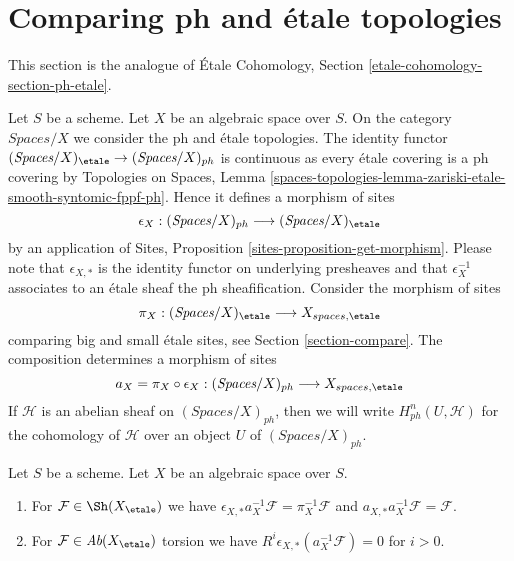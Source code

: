 \section{Comparing ph and \'etale topologies}
\label{section-ph-etale}

\noindent
This section is the analogue of
\'Etale Cohomology, Section \ref{etale-cohomology-section-ph-etale}.

\medskip\noindent
Let $S$ be a scheme. Let $X$ be an algebraic space over $S$.
On the category $\textit{Spaces}/X$ we consider the ph
and \'etale topologies. The identity functor
$(\textit{Spaces}/X)_\etale \to (\textit{Spaces}/X)_{ph}$
is continuous as every \'etale covering is a ph covering by
Topologies on Spaces, Lemma
\ref{spaces-topologies-lemma-zariski-etale-smooth-syntomic-fppf-ph}.
Hence it defines a morphism of sites
$$
\epsilon_X :
(\textit{Spaces}/X)_{ph} \longrightarrow (\textit{Spaces}/X)_\etale
$$
by an application of Sites, Proposition \ref{sites-proposition-get-morphism}.
Please note that $\epsilon_{X, *}$ is the identity functor on underlying
presheaves and that $\epsilon_X^{-1}$ associates to an \'etale sheaf the
ph sheafification.
Consider the morphism of sites
$$
\pi_X : (\textit{Spaces}/X)_\etale \longrightarrow X_{spaces, \etale}
$$
comparing big and small \'etale sites, see Section \ref{section-compare}.
The composition determines a morphism of sites
$$
a_X = \pi_X \circ \epsilon_X :
(\textit{Spaces}/X)_{ph}
\longrightarrow
X_{spaces, \etale}
$$
If $\mathcal{H}$ is an abelian sheaf on $(\textit{Spaces}/X)_{ph}$,
then we will write $H^n_{ph}(U, \mathcal{H})$ for the cohomology
of $\mathcal{H}$ over an object $U$ of $(\textit{Spaces}/X)_{ph}$.

\begin{lemma}
\label{lemma-comparison-ph-etale}
Let $S$ be a scheme. Let $X$ be an algebraic space over $S$.
\begin{enumerate}
\item For $\mathcal{F} \in \Sh(X_\etale)$ we have
$\epsilon_{X, *}a_X^{-1}\mathcal{F} = \pi_X^{-1}\mathcal{F}$
and $a_{X, *}a_X^{-1}\mathcal{F} = \mathcal{F}$.
\item For $\mathcal{F} \in \textit{Ab}(X_\etale)$ torsion we have
$R^i\epsilon_{X, *}(a_X^{-1}\mathcal{F}) = 0$ for $i > 0$.
\end{enumerate}
\end{lemma}

